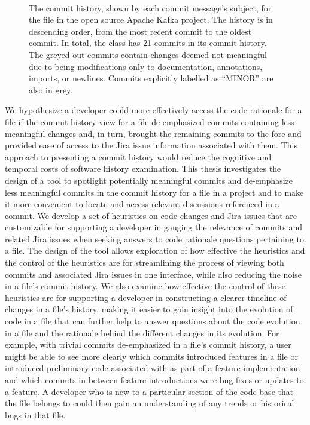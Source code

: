 \begin{figure}
\begin{RaggedRight}
	 \\
	\caption{The commit history, shown by each commit message's subject, for the  file in the open source Apache Kafka project. 		The history is in descending order, from the most recent commit to the oldest commit.
		In total, the  class has 21 commits in its commit history. The greyed out commits contain changes deemed not meaningful due 		to being modifications only to documentation, annotations, imports, or newlines. Commits explicitly labelled as ``MINOR'' are also in grey.}
	\label{fig:Topology-Commit-History}
\end{RaggedRight}
\end{figure}

We hypothesize a developer could more effectively access the code rationale for a file if the commit history view for a file de-emphasized commits containing less meaningful changes and, in turn, brought the remaining commits to the fore and provided ease of access to the Jira issue information associated with them.
This approach to presenting a commit history would reduce the cognitive and temporal costs of software history examination. %
This thesis investigates the design of a tool to spotlight potentially meaningful commits and de-emphasize less meaningful commits in the commit history for a file in a project and to make it more convenient to locate and access relevant discussions referenced in a commit. 
We develop a set of heuristics on code changes and Jira issues that are customizable for supporting a developer in gauging the relevance of commits and related Jira issues when seeking answers to code rationale questions pertaining to a file.
The design of the tool allows exploration of how effective the heuristics and the control of the heuristics are for streamlining the process of viewing both commits and associated Jira issues in one interface, while also reducing the noise in a file's commit history.
We also examine how effective the control of these heuristics are for supporting a developer in constructing a clearer timeline of changes in a file's history, making it easier to gain insight into the evolution of code in a file that can further help to answer questions about the code evolution in a file and the rationale behind the different changes in its evolution. 
For example, with trivial commits de-emphasized in a file's commit history, a user might be able to see more clearly which commits introduced features in a file or introduced preliminary code associated with as part of a feature implementation and which commits in between feature introductions were bug fixes or updates to a feature.
A developer who is new to a particular section of the code base that the file belongs to could then gain an understanding of any trends or historical bugs in that file.

